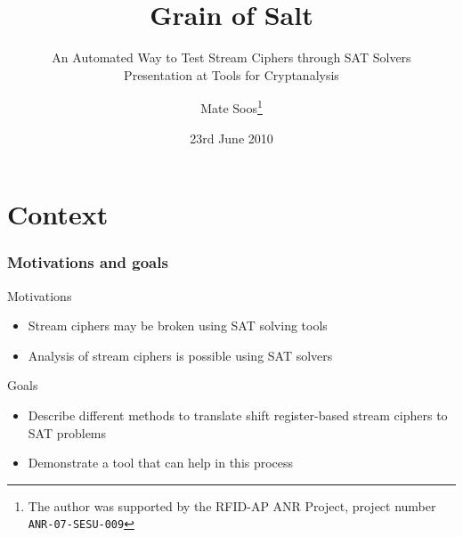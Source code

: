 \documentclass[xcolor=usenames,xcolor=svgnames,table,slidestop,compress,mathserif]{beamer}
\title[Grain of Salt]{Grain of Salt
}
\subtitle{An Automated Way to Test
Stream Ciphers through SAT Solvers\\\tiny Presentation at Tools for Cryptanalysis}
\author[Mate Soos]{\sc Mate Soos\footnote{The author was supported by the RFID-AP ANR Project, project number
\texttt{ANR-07-SESU-009}}}
\institute{Paris LIP6, SALSA Team}
\date{23rd June 2010}
\begin{document}
\begin{frame}
  \titlepage
\end{frame}

\setcounter{tocdepth}{2}

\section{Context}

\frame
{
\frametitle{Motivations and goals}
\begin{beamerboxesrounded}[shadow=true]{Motivations}
   \begin{itemize}
    \item Stream ciphers may be broken using SAT solving tools
    \item Analysis of stream ciphers is possible using SAT solvers
   \end{itemize}
\end{beamerboxesrounded}

\bigskip
\begin{beamerboxesrounded}[shadow=true]{Goals}
   \begin{itemize}
    \item Describe different methods to translate shift register-based stream ciphers to SAT problems
    \item Demonstrate a tool that can help in this process
   \end{itemize}
\end{beamerboxesrounded}
}
\end{document}

